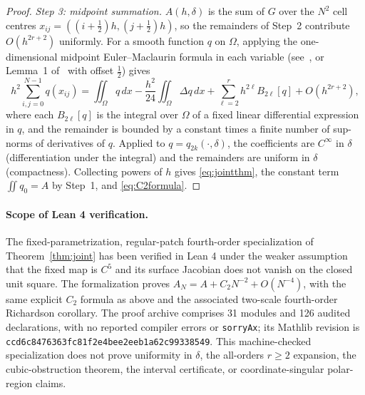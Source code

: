 \documentclass[11pt]{article}
\theoremstyle{remark}
\begin{document}
\begin{proof}
\emph{Step 3: midpoint summation.} $A(h,\delta)$ is the sum of $G$ over the $N^2$ cell centres
$x_{ij}=((i+\tfrac12)h,(j+\tfrac12)h)$, so the remainders of Step~2 contribute $O(h^{2r+2})$
uniformly. For a smooth function $q$ on $\Omega$, applying the one-dimensional midpoint
Euler--Maclaurin formula in each variable (see~\cite{davisrabinowitz}, or Lemma~1
of~\cite{verlindencools} with offset $\tfrac12$) gives
\[
h^2\sum_{i,j=0}^{N-1}q(x_{ij})=\iint_\Omega q\,dx-\frac{h^2}{24}\iint_\Omega\Delta q\,dx
+\sum_{\ell=2}^{r}h^{2\ell}B_{2\ell}[q]+O(h^{2r+2}),
\]
where each $B_{2\ell}[q]$ is the integral over $\Omega$ of a fixed linear differential
expression in $q$, and the remainder is bounded by a constant times a finite number of
sup-norms of derivatives of $q$. Applied to $q=q_{2k}(\cdot,\delta)$, the coefficients are
$C^\infty$ in $\delta$ (differentiation under the integral) and the remainders are uniform in
$\delta$ (compactness). Collecting powers of $h$ gives \eqref{eq:jointthm}, the constant term
$\iint q_0=A$ by Step~1, and \eqref{eq:C2formula}.
\end{proof}

\paragraph{Scope of Lean 4 verification.}
The fixed-parametrization, regular-patch fourth-order specialization of
Theorem~\ref{thm:joint} has been verified in Lean 4 under the weaker
assumption that the fixed map is $C^5$ and its surface Jacobian does not
vanish on the closed unit square. The formalization proves
$A_N=A+C_2N^{-2}+O(N^{-4})$, with the same explicit $C_2$ formula
as above and the associated two-scale fourth-order Richardson corollary.
The proof archive comprises 31 modules and 126 audited declarations, with
no reported compiler errors or \texttt{sorryAx}; its Mathlib revision is
\texttt{ccd6c8476363fc81f2e4bee2eeb1a62c99338549}.
This machine-checked specialization does not prove uniformity in $\delta$,
the all-orders $r\ge2$ expansion, the cubic-obstruction theorem,
the interval certificate, or coordinate-singular polar-region claims.
\end{document}
